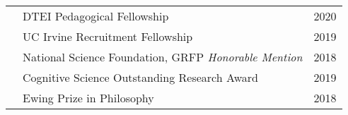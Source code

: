\documentclass[11pt]{cooperCV_v1/cooperCV} %
\begin{document}



%


\selectfont


\begin{minipage}{\textwidth}







\begin{tabular}{ p{} %
                 p{} 
                 p{}} %
  
  \small\textcolor{gray}{{\emph{  }}} & DTEI Pedagogical Fellowship & {\hfill \small{2020}}\\
  
  \small\textcolor{gray}{{\emph{  }}} & UC Irvine Recruitment Fellowship & {\hfill \small{2019}}\\
  
  \small\textcolor{gray}{{\emph{  }}} & National Science Foundation, GRFP \emph{Honorable Mention} & {\hfill \small{2018}}\\
  
  \small\textcolor{gray}{{\emph{  }}} & Cognitive Science Outstanding Research Award & {\hfill \small{2019}}\\
  
  \small\textcolor{gray}{{\emph{  }}} & Ewing Prize in Philosophy & {\hfill \small{2018}}\\
  

\end{tabular}
\end{minipage}
\end{document}
